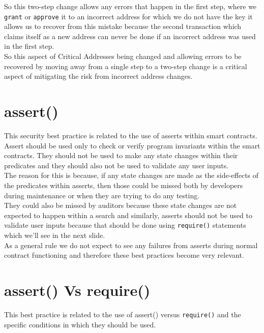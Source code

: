 So this two-step change allows any errors that happen in the first step, where we \texttt{grant} or \texttt{approve} it to an incorrect address for which we do not have the key it allows us to recover from this mistake because the second transaction which claims itself as a new address can never be done if an incorrect address was used in the first step.\\

So this aspect of Critical Addresses being changed and allowing errors to be recovered by moving away from a single step to a two-step change is a critical aspect of mitigating the risk from incorrect address changes.

\section{assert()}

This security best practice is related to the use of asserts within smart contracts. Assert should be used only to check or verify program invariants within the smart contracts. They should not be used to make any state changes within their predicates and they should also not be used to validate any user inputs.\\

The reason for this is because, if any state changes are made as the side-effects of the predicates within asserts, then those could be missed both by developers during maintenance or when they are trying to do any testing. \\

They could also be missed by auditors because these state changes are not expected to happen within a search and similarly, asserts should not be used to validate user inputs because that should be done using \texttt{require()} statements which we'll see in the next slide.\\

As a general rule we do not expect to see any failures from asserts during normal contract functioning and therefore these best practices become very relevant.

\section{assert() Vs require()}

This best practice is related to the use of assert() versus \texttt{require()} and the specific conditions in which they should be used. \\

